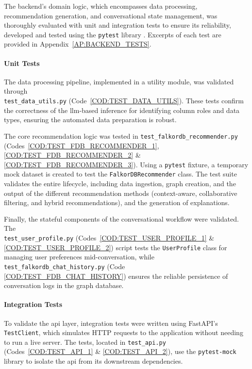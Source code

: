 The backend's domain logic, which encompasses data processing, recommendation generation, and conversational state management, was thoroughly evaluated with unit and integration tests to ensure its reliability, developed and tested using the \texttt{pytest} library \cite{PYTEST}. Excerpts of each test are provided in Appendix~\ref{AP:BACKEND_TESTS}.

\paragraph{Unit Tests}

The data processing pipeline, implemented in a utility module, was validated through \\ \texttt{test\_data\_utils.py} (Code~\ref{COD:TEST_DATA_UTILS}). These tests confirm the correctness of the \acs{llm}-based inference for identifying column roles and data types, ensuring the automated data preparation is robust.

The core recommendation logic was tested in \texttt{test\_falkordb\_recommender.py} (Codes~\ref{COD:TEST_FDB_RECOMMENDER_1}, \ref{COD:TEST_FDB_RECOMMENDER_2} \& \ref{COD:TEST_FDB_RECOMMENDER_3}). Using a \texttt{pytest} fixture, a temporary mock dataset is created to test the \texttt{FalkorDBRecommender} class. The test suite validates the entire lifecycle, including data ingestion, graph creation, and the output of the different recommendation methods (context-aware, collaborative filtering, and hybrid recommendations), and the generation of explanations.

Finally, the stateful components of the conversational workflow were validated. The \\ \texttt{test\_user\_profile.py} (Codes~\ref{COD:TEST_USER_PROFILE_1} \& \ref{COD:TEST_USER_PROFILE_2}) script tests the \texttt{UserProfile} class for managing user preferences mid-conversation, while \texttt{test\_falkordb\_chat\_history.py} (Code \ref{COD:TEST_FDB_CHAT_HISTORY}) ensures the reliable persistence of conversation logs in the graph database.

\paragraph{Integration Tests}

To validate the \acs{api} layer, integration tests were written using FastAPI's \texttt{TestClient}, which simulates HTTP requests to the application without needing to run a live server. The tests, located in \texttt{test\_api.py} (Codes~\ref{COD:TEST_API_1} \& \ref{COD:TEST_API_2}), use the \texttt{pytest-mock} library to isolate the \acs{api} from its downstream dependencies.

